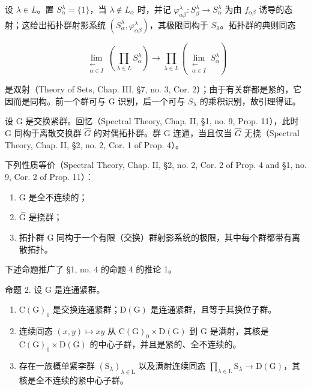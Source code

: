 设 \(\lambda \in L\)。置 \(S_{\alpha}^{\lambda} = \{1\}\)，当 \(\lambda \notin L_{\alpha}\) 时，并记 \(\varphi_{\alpha \beta}^{\lambda}: S_{\beta}^{\lambda} \to S_{\alpha}^{\lambda}\) 为由 \(f_{\alpha \beta}\) 诱导的态射；这给出拓扑群射影系统 \((S_{\alpha}^{\lambda}, \varphi_{\alpha \beta}^{\lambda})\)，其极限同构于 \(S_{\lambda}\)。拓扑群的典则同态

\[
\lim_{\substack{\longleftarrow \\ \alpha \in I}}\left(\prod_{\lambda \in L}S_{\alpha}^{\lambda}\right)\to \prod_{\lambda \in L}\left(\lim_{\substack{\longleftarrow \\ \alpha \in I}}S_{\alpha}^{\lambda}\right)
\]

是双射（Theory of Sets, Chap. III, §7, no. 3, Cor. 2）；由于有关群都是紧的，它因而是同构。前一个群可与 G 识别，后一个可与 \(S_{\lambda}\) 的乘积识别，故引理得证。


设 G 是交换紧群。回忆（Spectral Theory, Chap. II, §1, no. 9, Prop. 11），此时 G 同构于离散交换群 \(\hat{G}\) 的对偶拓扑群。群 G 连通，当且仅当 \(\hat{G}\) 无挠（Spectral Theory, Chap. II, §2, no. 2, Cor. 1 of Prop. 4）。

下列性质等价（Spectral Theory, Chap. II, §2, no. 2, Cor. 2 of Prop. 4 and §1, no. 9, Cor. 2 of Prop. 11）：

\begin{enumerate}
\def\labelenumi{(\roman{enumi})}
\item
  G 是全不连续的；
\item
  \(\hat{\mathrm{G}}\) 是挠群；
\item
  拓扑群 G 同构于一个有限（交换）群射影系统的极限，其中每个群都带有离散拓扑。
\end{enumerate}

下述命题推广了 §1, no. 4 的命题 4 的推论 1。

命题 2. 设 G 是连通紧群。

\begin{enumerate}
\def\labelenumi{\alph{enumi})}
\item
  \(\mathrm{C}(\mathrm{G})_{0}\) 是交换连通紧群；\(\mathrm{D}(\mathrm{G})\) 是连通紧群，且等于其换位子群。
\item
  连续同态 \((x,y)\mapsto xy\) 从 \(\mathrm{C}(\mathrm{G})_{0}\times\mathrm{D}(\mathrm{G})\) 到 G 是满射，其核是 \(\mathrm{C}(\mathrm{G})_{0}\times\mathrm{D}(\mathrm{G})\) 的中心子群，并且是紧的、全不连续的。
\item
  存在一族概单紧李群 \((\mathrm{S}_{\lambda})_{\lambda\in\mathrm{L}}\) 以及满射连续同态 \(\prod_{\lambda\in\mathrm{L}}\mathrm{S}_{\lambda}\to\mathrm{D}(\mathrm{G})\)，其核是全不连续的紧中心子群。
\end{enumerate}

